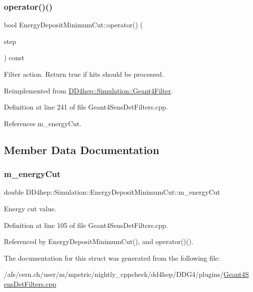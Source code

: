 \subsubsection{\texorpdfstring{operator()()}{operator()()}}
{\footnotesize\ttfamily bool Energy\+Deposit\+Minimum\+Cut\+::operator() (\begin{DoxyParamCaption}\item[{const G4\+Step $\ast$}]{step }\end{DoxyParamCaption}) const\hspace{0.3cm}{\ttfamily [virtual]}}



Filter action. Return true if hits should be processed. 



Reimplemented from \hyperlink{class_d_d4hep_1_1_simulation_1_1_geant4_filter_a373f84ddcbefe180daa058050b6cf753}{D\+D4hep\+::\+Simulation\+::\+Geant4\+Filter}.



Definition at line 241 of file Geant4\+Sens\+Det\+Filters.\+cpp.



References m\+\_\+energy\+Cut.



\subsection{Member Data Documentation}
\hypertarget{struct_d_d4hep_1_1_simulation_1_1_energy_deposit_minimum_cut_a465b72d5d4e13d7f3555cfdfc1947697}{}\label{struct_d_d4hep_1_1_simulation_1_1_energy_deposit_minimum_cut_a465b72d5d4e13d7f3555cfdfc1947697} 
\subsubsection{\texorpdfstring{m\+\_\+energy\+Cut}{m\_energyCut}}
{\footnotesize\ttfamily double D\+D4hep\+::\+Simulation\+::\+Energy\+Deposit\+Minimum\+Cut\+::m\+\_\+energy\+Cut}



Energy cut value. 



Definition at line 105 of file Geant4\+Sens\+Det\+Filters.\+cpp.



Referenced by Energy\+Deposit\+Minimum\+Cut(), and operator()().



The documentation for this struct was generated from the following file\+:\begin{DoxyCompactItemize}
\item 
/afs/cern.\+ch/user/m/mpetric/nightly\+\_\+cppcheck/dd4hep/\+D\+D\+G4/plugins/\hyperlink{_geant4_sens_det_filters_8cpp}{Geant4\+Sens\+Det\+Filters.\+cpp}\end{DoxyCompactItemize}
